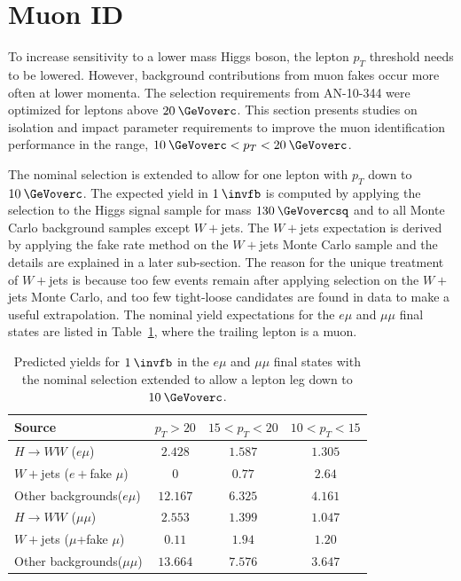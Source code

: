 \section{Muon ID}

To increase sensitivity to a lower mass Higgs boson, the lepton $p_T$ threshold needs to be lowered. However, background contributions from muon fakes occur more often at lower momenta. The selection requirements from AN-10-344 were optimized for leptons above $20\:\GeVoverc$. This section presents studies on isolation and impact parameter requirements to improve the muon identification performance in the range, $10\:\GeVoverc < p_T < 20\:\GeVoverc$.

The nominal selection is extended to allow for one lepton with $p_T$ down to $10\:\GeVoverc$. The expected yield in $1\:\invfb$ is computed by applying the selection to the Higgs signal sample for mass $130\:\GeVovercsq$ and to all Monte Carlo background samples except $W+$jets. The $W+$jets expectation is derived by applying the fake rate method on the $W+$jets Monte Carlo sample and the details are explained in a later sub-section. The reason for the unique treatment of $W+$jets is because too few events remain after applying selection on the $W+$jets Monte Carlo, and too few tight-loose candidates are found in data to make a useful extrapolation. The nominal yield expectations for the $e\mu$ and $\mu\mu$ final states are listed in Table~\ref{tab:muidyield0}, where the trailing lepton is a muon.

\begin{table}[!htbp]
\begin{center}
\begin{tabular}{|l|c|c|c|}
\hline
	Source & $p_T > 20$ & $15 < p_T < 20$ & $10 < p_T < 15$ \\
\hline
$H\rightarrow WW$ ($e\mu$) & $2.428$  & $1.587$ & $1.305$ \\
$W+$jets ($e+$fake $\mu$)  & $0$      & $0.77$  & $2.64$ \\
Other backgrounds($e\mu$)  & $12.167$ & $6.325$ & $4.161$ \\
\hline
$H\rightarrow WW$ ($\mu\mu$) & $2.553$  & $1.399$ & $1.047$ \\
$W+$jets ($\mu$+fake $\mu$)  & $0.11$   & $1.94$  & $1.20$ \\
Other backgrounds($\mu\mu$)  & $13.664$ & $7.576$ & $3.647$ \\
\hline
\end{tabular}
\caption{Predicted yields for $1\:\invfb$ in the $e\mu$ and $\mu\mu$ final states with the nominal selection extended to allow a lepton leg down to $10\:\GeVoverc$.}
\label{tab:muidyield0}
\end{center}
\end{table}

